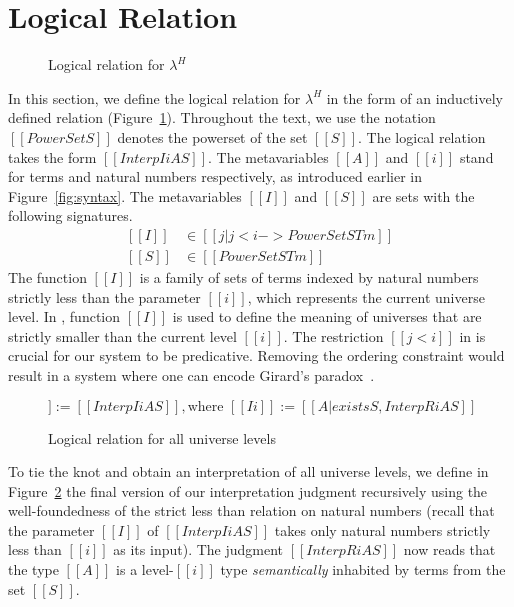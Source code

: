 \documentclass[acmsmall]{acmart}
\newcommand{\lang}{$\lambda^H$\xspace}
\begin{document}
\section{Logical Relation}
\label{sec:logreldep}
\begin{figure}[h]
\caption{Logical relation for \lang}
\label{fig:logrel}
\end{figure}
In this section, we define the logical relation for \lang{} in the
form of an inductively defined relation (Figure~\ref{fig:logrel}).
Throughout the text, we use the notation $[[PowerSet S]]$ denotes the powerset of the set $[[S]]$.
The logical relation takes the form $[[Interp I i A S]]$. The
metavariables $[[A]]$ and $[[i]]$ stand for terms and natural
numbers respectively, as introduced earlier in
Figure~\ref{fig:syntax}.
The metavariables $[[I]]$ and $[[S]]$ are
sets with the following signatures.
\begin{equation*}
  \begin{split}
    [[I]] &\in [[ { j | j < i  } ->  PowerSet STm ]] \\
    [[S]] &\in [[PowerSet STm]]
  \end{split}
\end{equation*}
The function $[[I]]$ is a family of sets of terms indexed by
natural numbers strictly less than the parameter $[[i]]$, which
represents the current universe level.  In , function
$[[I]]$ is used to define the meaning of
universes that are strictly smaller than the current level $[[i]]$. The
restriction $[[j < i]]$ in  is crucial for our system to
be predicative. Removing the ordering constraint would result in a
system where one can encode Girard's paradox~\citep{girard-thesis}.

\begin{figure}[h]
\begin{equation*}
    [[InterpR i A S]] := [[ Interp I i A S  ]], \text{where } [[I i]] := [[{A | exists S , InterpR i A S}]]
\end{equation*}
\caption{Logical relation for all universe levels}
\label{fig:logrelrec}
\end{figure}
To tie the knot and obtain an interpretation of all universe levels,
we define in Figure~\ref{fig:logrelrec} the final version of our interpretation judgment recursively
using the well-foundedness of the strict less than relation on natural
numbers (recall that
the parameter $[[I]]$ of $[[Interp I i A S]]$ takes only natural
numbers strictly less than $[[i]]$ as its input).
The judgment $[[InterpR i A S]]$ now reads that the type $[[A]]$ is a
level-$[[i]]$ type \emph{semantically} inhabited by terms from the set
$[[S]]$.
\end{document}
